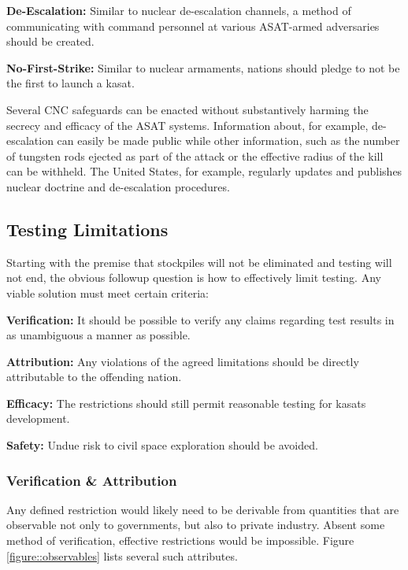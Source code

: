 \textbf{De-Escalation:} Similar to nuclear de-escalation channels, a
method of communicating with command personnel at various ASAT-armed
adversaries should be created.

\textbf{No-First-Strike:} Similar to nuclear armaments, nations should
pledge to not be the first to launch a \ac{kasat}.

Several CNC safeguards can be enacted without substantively harming
the secrecy and efficacy of the ASAT systems.  Information about, for
example, de-escalation can easily be made public while other
information, such as the number of tungsten rods ejected as part of
the attack or the effective radius of the kill can be withheld.  The
United States, for example, regularly updates and publishes nuclear
doctrine and de-escalation procedures.\cite[What to cite for this
  one??? Ask foster]{xxx}

\subsection{Testing Limitations}
Starting with the premise that stockpiles will not be eliminated and
testing will not end, the obvious followup question is how to
effectively limit testing.  Any viable solution must meet certain
criteria:

\textbf{Verification:} It should be possible to verify any claims
regarding test results in as unambiguous a manner as possible.

\textbf{Attribution:} Any violations of the agreed limitations should
be directly attributable to the offending nation.

\textbf{Efficacy:} The restrictions should still permit reasonable
testing for \acp{kasat} development.

\textbf{Safety:} Undue risk to civil space exploration should be
avoided.

\subsubsection{Verification \& Attribution}
Any defined restriction would likely need to be derivable from
quantities that are observable not only to governments, but also to
private industry.  Absent some method of verification, effective
restrictions would be impossible.  Figure \ref{figure::observables}
lists several such attributes.

